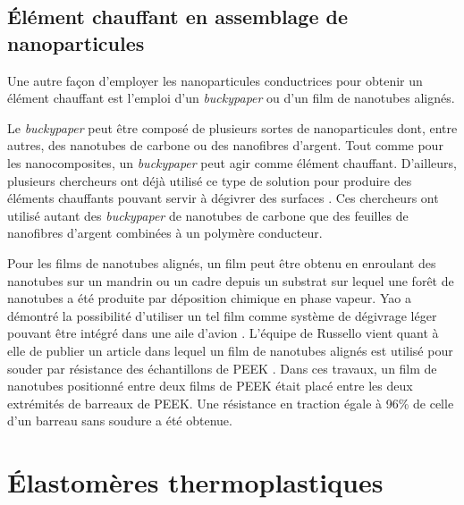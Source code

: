 \subsection{Élément chauffant en assemblage de nanoparticules}

Une autre façon d'employer les nanoparticules conductrices pour obtenir un élément chauffant est l'emploi d'un \textit{buckypaper} ou d'un film de nanotubes alignés. 

Le \textit{buckypaper} peut être composé de plusieurs sortes de nanoparticules dont, entre autres, des nanotubes de carbone ou des nanofibres d'argent. 
Tout comme pour les nanocomposites, un \textit{buckypaper} peut agir comme élément chauffant. 
D'ailleurs, plusieurs chercheurs ont déjà utilisé ce type de solution pour produire des éléments chauffants pouvant servir à dégivrer des surfaces \cite{Pyo2016,Chu2014,Zhang2013}.
Ces chercheurs ont utilisé autant des \textit{buckypaper} de nanotubes de carbone que des feuilles de nanofibres d'argent combinées à un polymère conducteur. 

Pour les films de nanotubes alignés, un film peut être obtenu en enroulant des nanotubes sur un mandrin ou un cadre depuis un substrat sur lequel une forêt de nanotubes a été produite par déposition chimique en phase vapeur. 
Yao a démontré la possibilité d'utiliser un tel film comme système de dégivrage léger pouvant être intégré dans une aile d'avion \cite{Yao2018}.
L'équipe de Russello vient quant à elle de publier un article dans lequel un film de nanotubes alignés est utilisé pour souder par résistance des échantillons de PEEK \cite{Russello2019}. 
Dans ces travaux, un film de nanotubes positionné entre deux films de PEEK était placé entre les deux extrémités de barreaux de PEEK. 
Une résistance en traction égale à 96\% de celle d'un barreau sans soudure a été obtenue. 

\FloatBarrier
\section{Élastomères thermoplastiques}  

\newcommand\setpolymerdelim[2]{\def\delimleft{#1}\def\delimright{#2}}
\def\makebraces[#1,#2]#3#4#5{%
	\edef\delimhalfdim{\the\dimexpr(#1+#2)/2}%
	\edef\delimvshift{\the\dimexpr(#1-#2)/2}%
	\chemmove{%
		\node[at=(#4),yshift=(\delimvshift)]
		{$\left\delimleft\vrule height\delimhalfdim depth\delimhalfdim
			width0pt\right.$};%
		\node[at=(#5),yshift=(\delimvshift)]
		{$\left.\vrule height\delimhalfdim depth\delimhalfdim
			width0pt\right\delimright_{\rlap{$\scriptstyle#3$}}$};}}
\setpolymerdelim()

